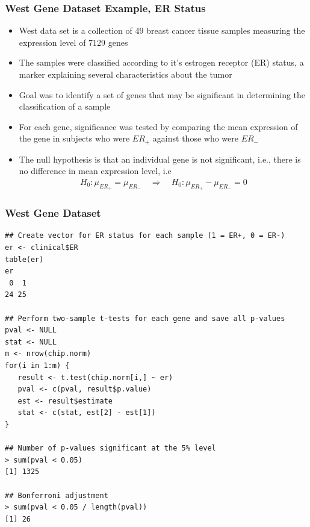 \documentclass[11pt]{beamer}
\begin{document}
\begin{frame}
\frametitle{West Gene Dataset Example, ER Status}
{
\begin{itemize}
\item West data set is a collection of 49 breast cancer tissue samples measuring the expression level of 7129 genes \\
\item The samples were classified according to it's estrogen receptor (ER) status, a marker explaining several characteristics about the tumor \\
\item Goal was to identify a set of genes that may be significant in determining the classification of a sample \\
\item For each gene, significance was tested by comparing the mean expression of the gene in subjects who were $ER_+$ against those who were $ER_-$ \\
\item The null hypothesis is that an individual gene is not significant, i.e., there is no difference in mean expression level, i.e
\begin{align*}
H_0: \mu_{ER_+} = \mu_{ER_-} \quad \Rightarrow \quad H_0:  \mu_{ER_+} - \mu_{ER_-} = 0
\end{align*}
\end{itemize}
}
\end{frame}

\begin{frame}[fragile]
\frametitle{West Gene Dataset}
{
\begin{lstlisting}
## Create vector for ER status for each sample (1 = ER+, 0 = ER-)
er <- clinical$ER
table(er)
er
 0  1 
24 25 

## Perform two-sample t-tests for each gene and save all p-values
pval <- NULL
stat <- NULL
m <- nrow(chip.norm)
for(i in 1:m) {
   result <- t.test(chip.norm[i,] ~ er)
   pval <- c(pval, result$p.value)
   est <- result$estimate
   stat <- c(stat, est[2] - est[1])
}

## Number of p-values significant at the 5% level
> sum(pval < 0.05)
[1] 1325

## Bonferroni adjustment
> sum(pval < 0.05 / length(pval))
[1] 26
\end{lstlisting}
}
\end{frame}
\end{document}
